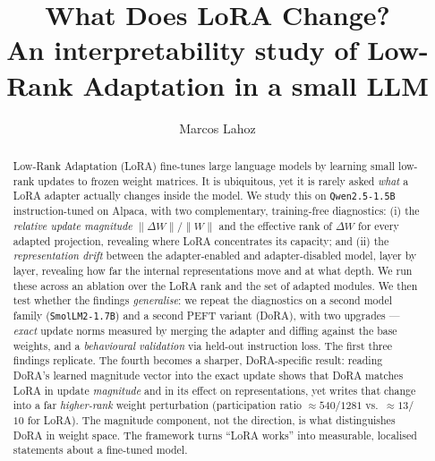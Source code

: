 \documentclass[11pt,a4paper]{article}
\title{\textbf{What Does LoRA Change?}\\
\large An interpretability study of Low-Rank Adaptation in a small LLM}
\author{Marcos Lahoz}
\date{}
\begin{document}
\maketitle

\begin{abstract}
Low-Rank Adaptation (LoRA) fine-tunes large language models by learning small
low-rank updates to frozen weight matrices. It is ubiquitous, yet it is rarely
asked \emph{what} a LoRA adapter actually changes inside the model. We study this
on \texttt{Qwen2.5-1.5B} instruction-tuned on Alpaca, with two complementary,
training-free diagnostics: (i) the \emph{relative update magnitude}
$\lVert\Delta W\rVert/\lVert W\rVert$ and the effective rank of $\Delta W$ for
every adapted projection, revealing where LoRA concentrates its capacity; and
(ii) the \emph{representation drift} between the adapter-enabled and
adapter-disabled model, layer by layer, revealing how far the internal
representations move and at what depth. We run these across an ablation over the
LoRA rank and the set of adapted modules. We then test whether the findings
\emph{generalise}: we repeat the diagnostics on a second model family
(\texttt{SmolLM2-1.7B}) and a second PEFT variant (DoRA), with two upgrades ---
\emph{exact} update norms measured by merging the adapter and diffing against the
base weights, and a \emph{behavioural validation} via held-out instruction loss.
The first three findings replicate. The fourth becomes a sharper, DoRA-specific
result: reading DoRA's learned magnitude vector into the exact update shows that
DoRA matches LoRA in update \emph{magnitude} and in its effect on representations,
yet writes that change into a far \emph{higher-rank} weight perturbation
(participation ratio $\approx 540$/$1281$ vs.\ $\approx 13$/$10$ for LoRA). The
magnitude component, not the direction, is what distinguishes DoRA in weight
space. The framework turns ``LoRA works'' into measurable, localised statements
about a fine-tuned model.
\end{abstract}
\end{document}
